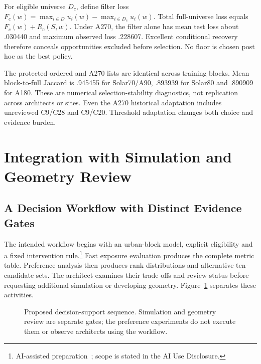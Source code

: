 \documentclass{llncs}
\newcommand{\aidraft}{\footnote{AI-assisted preparation~\cite{openai2026}; scope is stated in the AI Use Disclosure.}}
\begin{document}
For eligible universe $D_c$, define filter loss $F_c(w)=\max_{i\in D}u_i(w)-\max_{i\in D_c}u_i(w)$. Total full-universe loss equals $F_c(w)+R_c(S,w)$. Under A270, the filter alone has mean test loss about .030440 and maximum observed loss .228607. Excellent conditional recovery therefore conceals opportunities excluded before selection. No floor is chosen post hoc as the best policy.

The protected ordered and A270 lists are identical across training blocks. Mean block-to-full Jaccard is .945455 for Solar70/A90, .893939 for Solar80 and .890909 for A180. These are numerical selection-stability diagnostics, not replication across architects or sites. Even the A270 historical adaptation includes unreviewed C9/C28 and C9/C20. Threshold adaptation changes both choice and evidence burden.

\section{Integration with Simulation and Geometry Review}
\subsection{A Decision Workflow with Distinct Evidence Gates}
The intended workflow begins with an urban-block model, explicit eligibility and a fixed intervention rule.\aidraft{} Fast exposure evaluation produces the complete metric table. Preference analysis then produces rank distributions and alternative ten-candidate sets. The architect examines their trade-offs and review status before requesting additional simulation or developing geometry. Figure~\ref{fig:workflow} separates these activities.

\begin{figure}[tbp]\centering
{}
\caption{Proposed decision-support sequence. Simulation and geometry review are separate gates; the preference experiments do not execute them or observe architects using the workflow.}\label{fig:workflow}\end{figure}
\end{document}
